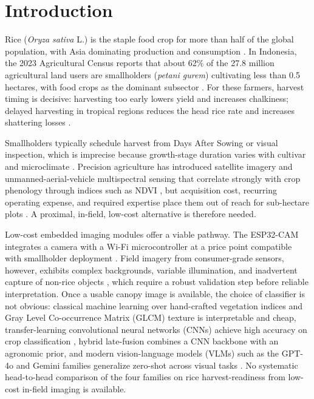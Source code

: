 \documentclass[conference]{IEEEtran}
\begin{document}
\section{Introduction}
Rice (\textit{Oryza sativa} L.) is the staple food crop for more than half of the global population, with Asia dominating production and consumption \cite{b_mohidem}. In Indonesia, the 2023 Agricultural Census reports that about 62\% of the 27.8 million agricultural land users are smallholders (\textit{petani gurem}) cultivating less than 0.5 hectares, with food crops as the dominant subsector \cite{b_bps}. For these farmers, harvest timing is decisive: harvesting too early lowers yield and increases chalkiness; delayed harvesting in tropical regions reduces the head rice rate and increases shattering losses \cite{b_zhou}.

Smallholders typically schedule harvest from Days After Sowing or visual inspection, which is imprecise because growth-stage duration varies with cultivar and microclimate \cite{b_sanwong}. Precision agriculture has introduced satellite imagery and unmanned-aerial-vehicle multispectral sensing that correlate strongly with crop phenology through indices such as NDVI \cite{b_huang}, but acquisition cost, recurring operating expense, and required expertise place them out of reach for sub-hectare plots \cite{b_boursianis}. A proximal, in-field, low-cost alternative is therefore needed.

Low-cost embedded imaging modules offer a viable pathway. The ESP32-CAM integrates a camera with a Wi-Fi microcontroller at a price point compatible with smallholder deployment \cite{b_elhattab}. Field imagery from consumer-grade sensors, however, exhibits complex backgrounds, variable illumination, and inadvertent capture of non-rice objects \cite{b_tan}, which require a robust validation step before reliable interpretation. Once a usable canopy image is available, the choice of classifier is not obvious: classical machine learning over hand-crafted vegetation indices and Gray Level Co-occurrence Matrix (GLCM) texture is interpretable and cheap, transfer-learning convolutional neural networks (CNNs) achieve high accuracy on crop classification \cite{b_qin}, hybrid late-fusion combines a CNN backbone with an agronomic prior, and modern vision-language models (VLMs) such as the GPT-4o and Gemini families generalize zero-shot across visual tasks \cite{b_zhang}. No systematic head-to-head comparison of the four families on rice harvest-readiness from low-cost in-field imaging is available.
\end{document}
